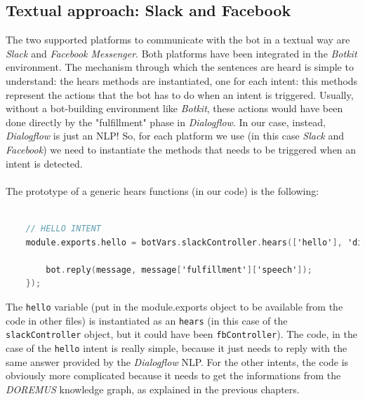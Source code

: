 \documentclass[a4paper,12pt]{report}
\begin{document}
	\subsection{Textual approach: Slack and Facebook}
	The two supported platforms to communicate with the bot in a textual way are \textit{Slack} and \textit{Facebook Messenger}. Both platforms have been integrated in the \textit{Botkit} environment. The mechanism through which the sentences are heard is simple to understand: the hears methods are instantiated, one for each intent: this methods represent the actions that the bot has to do when an intent is triggered. Usually, without a bot-building environment like \textit{Botkit}, these actions would have been done directly by the "fulfillment" phase in \textit{Dialogflow}. In our case, instead, \textit{Dialogflow} is just an NLP! So, for each platform we use (in this case \textit{Slack} and \textit{Facebook}) we need to instantiate the methods that needs to be triggered when an intent is detected.\\\\
	The prototype of a generic hears functions (in our code) is the following:
	\begin{lstlisting}[language=C]
	
	// HELLO INTENT
	module.exports.hello = botVars.slackController.hears(['hello'], 'direct_message, direct_mention, mention', botVars.dialogflowMiddleware.hears, function(bot, message) {
	
		bot.reply(message, message['fulfillment']['speech']);
	});
	\end{lstlisting}
	The \texttt{hello} variable (put in the module.exports object to be available from the code in other files) is instantiated as an \texttt{hears} (in this case of the \texttt{slackController} object, but it could have been \texttt{fbController}). The code, in the case of the \texttt{hello} intent is really simple, because it just needs to reply with the same answer provided by the \textit{Dialogflow} NLP. For the other intents, the code is obviously more complicated because it needs to get the informations from the \textit{DOREMUS} knowledge graph, as explained in the previous chapters.\\\\
	
\end{document}
